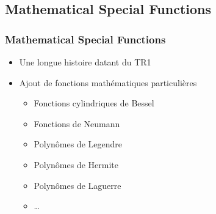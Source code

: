 \documentclass[C++.tex]{subfiles}
\begin{document}
\subsection*{Mathematical Special Functions}
\begin{frame}[fragile]
	\frametitle{Mathematical Special Functions}
	\begin{itemize}
		\item Une longue histoire datant du TR1
		\item Ajout de fonctions mathématiques particulières
		\begin{itemize}
			\item Fonctions cylindriques de Bessel
			\item Fonctions de Neumann
			\item Polynômes de Legendre
			\item Polynômes de Hermite
			\item Polynômes de Laguerre
			\item \ldots{}
		\end{itemize}
	\end{itemize}

\end{frame}
\end{document}
